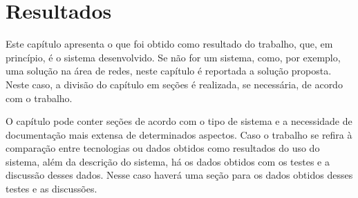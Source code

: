 
\chapter{Resultados}\label{cap:resultados}

Este capítulo apresenta o que foi obtido como resultado do trabalho, que, em princípio, é o sistema desenvolvido. Se não for um sistema, como, por exemplo, uma solução na área de redes, neste capítulo é reportada a solução proposta. Neste caso, a divisão do capítulo em seções é realizada, se necessária, de acordo com o trabalho.

O capítulo pode conter seções de acordo com o tipo de sistema e a necessidade de documentação mais extensa de determinados aspectos. Caso o trabalho se refira à comparação entre tecnologias ou dados obtidos como resultados do uso do sistema, além da descrição do sistema, há os dados obtidos com os testes e a discussão desses dados. Nesse caso haverá uma seção para os dados obtidos desses testes e as discussões.
